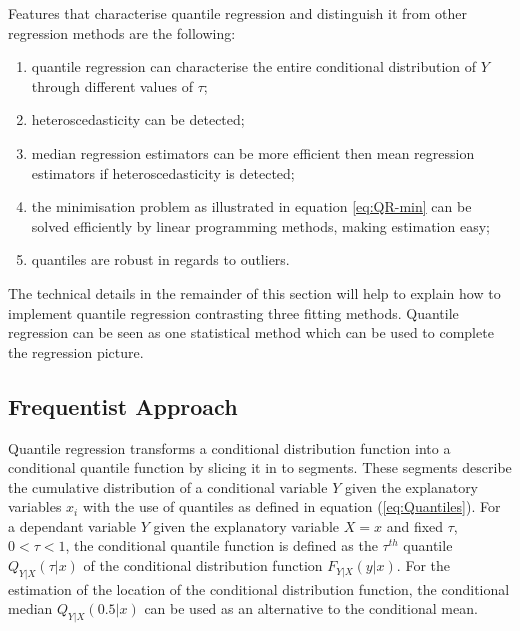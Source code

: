 \documentclass[12pt,a4paper]{report}
\begin{document}
\begin{flushleft}
Features that characterise quantile regression and distinguish it from other regression methods are the following:
\end{flushleft}
\begin{enumerate}
    \item quantile regression can characterise the entire conditional distribution of $Y$ through different values of $\tau$;
    \item heteroscedasticity can be detected;
    \item median regression estimators can be more efficient then mean regression estimators if heteroscedasticity is detected;
    \item the minimisation problem as illustrated in equation \ref{eq:QR-min} can be solved efficiently by linear programming methods, making estimation easy;
    \item quantiles are robust in regards to outliers.
\end{enumerate}

The technical details in the remainder of this section will help to explain how to implement quantile regression contrasting three fitting methods. Quantile regression can be seen as one statistical method which can be used to complete the regression picture.

\subsection{Frequentist Approach}
Quantile regression transforms a conditional distribution function into a conditional quantile function by slicing it in to segments. These segments describe the cumulative distribution of a conditional variable $Y$ given the explanatory variables $x_{i}$ with the use of quantiles as defined in equation (\ref{eq:Quantiles}). For a dependant variable $Y$ given the explanatory variable $X=x$ and fixed $\tau$, $0<\tau<1$, the conditional quantile function is defined as the $\tau^{th}$ quantile $Q_{Y|X}(\tau|x)$ of the conditional distribution function $F_{Y|X}(y|x)$. For the estimation of the location of the conditional distribution function, the conditional median $Q_{Y|X}(0.5|x)$ can be used as an alternative to the conditional mean.
\vspace{2mm}
\end{document}
